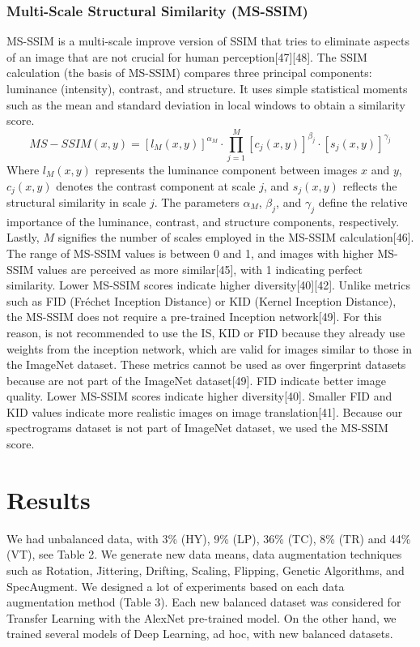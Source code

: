 \documentclass[journal]{IEEEtran}
\begin{document}
\subsubsection{Multi-Scale Structural Similarity (MS-SSIM)}
MS-SSIM is a multi-scale improve version of SSIM that tries to eliminate aspects of an image that are not crucial for human perception[47][48]. The SSIM calculation (the basis of MS-SSIM) compares three principal components: luminance (intensity), contrast, and structure. It uses simple statistical moments such as the mean and standard deviation in local windows to obtain a similarity score.
$$MS-SSIM(x,y)=\left[l_M (x,y)\right]^{\alpha_M}\cdot \prod_{j=1}^{M}\left[c_j(x,y)\right]^{\beta_j}\cdot \left[s_j (x,y)\right]^{\gamma_j}$$
Where $l_M (x,y)$ represents the luminance component between images $x$ and $y$, $c_j(x,y)$ denotes the contrast component at scale $j$, and $s_j(x,y)$ reflects the structural similarity in scale $j$. The parameters $\alpha_M$, $\beta_j$, and $\gamma_j$ define the relative importance of the luminance, contrast, and structure components, respectively. Lastly, $M$ signifies the number of scales employed in the MS-SSIM calculation[46].
The range of MS-SSIM values is between 0 and 1, and images with higher MS-SSIM values are perceived as more similar[45], with 1 indicating perfect similarity. Lower MS-SSIM scores indicate higher diversity[40][42].
Unlike metrics such as FID (Fréchet Inception Distance) or KID (Kernel Inception Distance), the MS-SSIM does not require a pre-trained Inception network[49]. For this reason, is not recommended to use the IS, KID or FID because they already use weights from the inception network, which are valid for images similar to those in the ImageNet dataset. These metrics cannot be used as over fingerprint datasets because are not part of the ImageNet dataset[49]. 
FID indicate better image quality. Lower MS-SSIM scores indicate higher diversity[40]. Smaller FID and KID values indicate more realistic images on image translation[41].
Because our spectrograms dataset is not part of ImageNet dataset, we used the MS-SSIM score.


\section{Results}
We had unbalanced data, with 3\% (HY), 9\% (LP), 36\% (TC), 8\% (TR) and 44\% (VT), see Table 2. We generate new data means, data augmentation techniques such as Rotation, Jittering, Drifting, Scaling, Flipping, Genetic Algorithms, and SpecAugment. We designed a lot of experiments based on each data augmentation method (Table 3). Each new balanced dataset was considered for Transfer Learning with the AlexNet pre-trained model. On the other hand, we trained several models of Deep Learning, ad hoc, with new balanced datasets.
\end{document}
